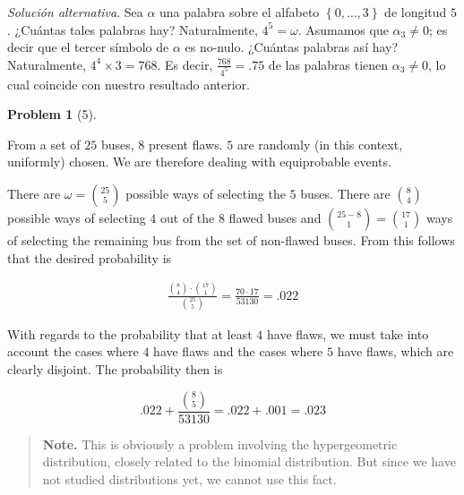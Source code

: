 \documentclass[a4paper, 12pt]{article}
\newtheorem{problem}{Problem}
\newtheorem{problem}{Problem}
\begin{document}
    \textit{Solución alternativa}. Sea $\alpha$ una palabra sobre el alfabeto $\left\{ 0,\ldots,3 \right\} $
    de longitud $5$. ¿Cuántas tales palabras hay? Naturalmente, $4^5 = \omega$.
    Asumamos que $\alpha_3 \neq 0$; es decir que el tercer símbolo de $\alpha$
    es no-nulo. ¿Cuántas palabras así hay? Naturalmente, $4^4 \times 3 = 768$.
    Es decir, $\frac{768}{4^5} = .75$ de las palabras tienen $\alpha_3 \neq 0$,
    lo cual coincide con nuestro resultado anterior.


    \pagebreak 

    \begin{problem}[5]
        
    \end{problem}


    From a set of $25$ buses, $8$ present flaws. $5$ are randomly (in this
    context, uniformly) chosen. We are therefore dealing with equiprobable
    events.  

    There are $\omega = \binom{25}{5}$ possible ways of selecting the $5$ buses. 
    There are $\binom{8}{4}$ possible ways of selecting $4$ out of the $8$
    flawed buses and $\binom{25-8}{1} = \binom{17}{1}$ ways of selecting the 
    remaining bus from the set of non-flawed buses. From this follows that the desired probability is

    \begin{align*}
        \frac{\binom{8}{4} \cdot\binom{17}{1}}{\binom{25}{5}}= \frac{70 \cdot 17}{53130} = .022
    \end{align*}


    With regards to the probability that at least $4$ have flaws, we must take 
    into account the cases where $4$ have flaws and the cases where $5$ have 
    flaws, which are clearly disjoint. The probability then is

    \begin{equation*}
        .022 + \frac{\binom{8}{5}}{53130} = .022 + .001 = .023
    \end{equation*}

    
    \small
    \begin{quote}
    
    \textbf{Note.} This is obviously a problem involving the hypergeometric distribution, 
    closely related to the binomial distribution. But since we have not studied 
    distributions yet, we cannot use this fact.
    
    \end{quote}
    \normalsize
    
\end{document}

